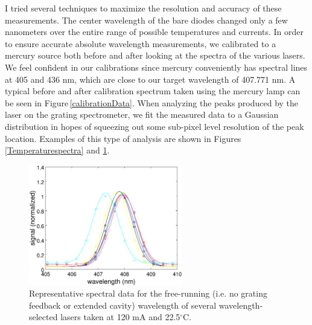 I tried several techniques to maximize the resolution and accuracy of these measurements. The center wavelength of the bare diodes changed only a few nanometers over the entire range of possible temperatures and currents. In order to ensure accurate absolute wavelength measurements, we calibrated to a mercury source both before and after looking at the spectra of the various lasers. We feel confident in our calibrations since mercury conveniently has spectral lines at 405 and 436 nm, which are close to our target wavelength of 407.771 nm. A typical before and after calibration spectrum taken using the mercury lamp can be seen in Figure\,\ref{calibrationData}. When analyzing the peaks produced by the laser on the grating spectrometer, we fit the measured data to a Gaussian distribution in hopes of squeezing out some sub-pixel level resolution of the peak location. Examples of this type of analysis are shown in Figures\,\ref{Temperaturespectra} and \ref{wavelengthselected}.


\begin{figure}
\fontsize{20}{40}\selectfont
\centering
\includegraphics[width=0.60\textwidth]{wavelength_selected.eps} 
\caption[Wavelength of different laser diodes]{\label{wavelengthselected} Representative spectral data for the free-running (i.e. no grating feedback or extended cavity) wavelength of several wavelength-selected lasers taken at 120 mA and 22.5$^\circ$C.} %
\end{figure}


